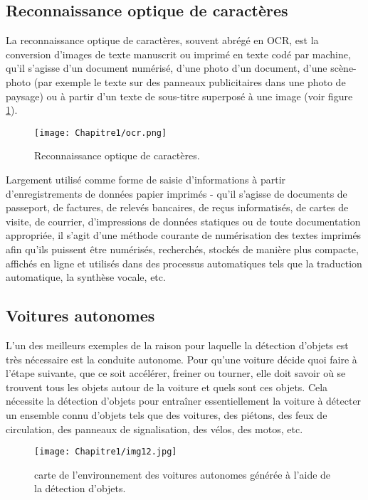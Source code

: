      \subsection{Reconnaissance optique de caractères }
La reconnaissance optique de caractères, souvent abrégé en OCR, est la conversion d'images de texte  manuscrit ou imprimé en texte codé par machine, qu'il s'agisse d'un document numérisé, d'une photo d'un document, d'une scène-photo (par exemple le texte sur des panneaux  publicitaires dans une photo de paysage) ou à partir d'un texte de sous-titre superposé à une image (voir figure \ref{ocr}).
\begin{figure}[H]
\centering
\texttt{[image: Chapitre1/ocr.png]}
\caption{Reconnaissance optique de caractères.}
\label{ocr}
\end{figure}     
Largement utilisé comme forme de saisie d'informations à partir d'enregistrements de données papier imprimés - qu'il s'agisse de documents de passeport, de factures, de relevés bancaires, de reçus informatisés, de cartes de visite, de courrier, d'impressions de données statiques ou de toute documentation appropriée, il s'agit d'une méthode courante de numérisation des textes imprimés afin qu'ils puissent être numérisés, recherchés, stockés de manière plus compacte, affichés en ligne et utilisés dans des processus automatiques tels que la traduction automatique, la synthèse vocale,  etc.
     
     \subsection{Voitures autonomes}
 L'un des meilleurs exemples de la raison pour laquelle la détection d'objets est très nécessaire est la conduite autonome. Pour qu'une voiture décide quoi faire à l'étape suivante, que ce soit accélérer, freiner ou tourner, elle doit savoir où se trouvent tous les objets autour de la voiture et quels sont ces objets.  Cela nécessite la détection d'objets pour entraîner essentiellement la voiture à détecter un ensemble connu d'objets tels que des voitures, des piétons, des feux de circulation, des panneaux de signalisation, des vélos, des motos, etc.

      \begin{figure}[H]
          \centering
          \texttt{[image: Chapitre1/img12.jpg]}
          \caption{carte de l'environnement des voitures autonomes générée à l'aide de la détection d'objets.}
          \label{img12}
          \end{figure}

